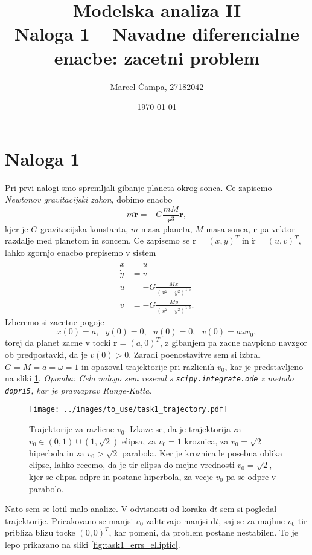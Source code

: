 \documentclass[11pt, a4paper]{article}
\title{Modelska analiza II\\\footnotesize Naloga 1 -- Navadne diferencialne enacbe: zacetni problem}
\author{Marcel Čampa, 27182042}
\date{\today}
\begin{document}
    \maketitle

    \section*{Naloga 1}
    Pri prvi nalogi smo spremljali gibanje planeta okrog sonca. Ce zapisemo \textit{Newtonov
    gravitacijski zakon}, dobimo enacbo
    $$ m \ddot{\mathbf{r}} = -G \frac{mM}{r^3} \mathbf{r},$$
    kjer je $G$ gravitacijska konstanta, $m$ masa planeta, $M$ masa sonca, $\mathbf{r}$ pa vektor razdalje med planetom in soncem.
    Ce zapisemo se $\mathbf{r} = (x, y)^T$ in $\dot{\mathbf{r}} = (u, v)^T$, lahko zgornjo enacbo prepisemo v
    sistem
    \begin{align*}
        \dot{x} &= u\\
        \dot{y} &= v\\
        \dot{u} &= -G \frac{Mx}{(x^2 + y^2)^{1.5}}\\
        \dot{v} &= -G \frac{My}{(x^2 + y^2)^{1.5}}.
    \end{align*}
    Izberemo si zacetne pogoje $$x(0) = a,~~~ y(0) = 0, ~~~u(0) = 0,~~~v(0) = a\omega v_0,$$
    torej da planet zacne v tocki $\mathbf{r} = (a, 0)^T$, z gibanjem pa zacne navpicno navzgor ob predpostavki, da je
    $v(0) > 0$. Zaradi poenostavitve sem si izbral $G = M = a = \omega = 1$ in opazoval trajektorije
    pri razlicnih $v_0$, kar je predstavljeno na sliki \ref{fig:task1_trajectory}. \textit{Opomba: Celo nalogo sem reseval
    s \texttt{scipy.integrate.ode} z metodo \texttt{dopri5}, kar je pravzaprav Runge-Kutta.}

    \begin{figure}[H]
        \centering
        \texttt{[image: ../images/to\_use/task1\_trajectory.pdf]}
        \caption{Trajektorije za razlicne $v_0$. Izkaze se, da je trajektorija za $v_0 \in (0, 1) \cup (1, \sqrt{2})$ elipsa,
        za $v_0 = 1$ kroznica, za $v_0 = \sqrt{2}$ hiperbola in za $v_0 > \sqrt{2}$ parabola. Ker je kroznica le posebna oblika elipse, lahko recemo, da je tir
        elipsa do mejne vrednosti $v_0 = \sqrt{2}$, kjer se elipsa odpre in postane hiperbola, za vecje $v_0$ pa se odpre v parabolo.}
        \label{fig:task1_trajectory}
    \end{figure}

    Nato sem se lotil malo analize. V odvisnosti od koraka $\text{d}t$ sem si pogledal trajektorije. Pricakovano se
    manjsi $v_0$ zahtevajo manjsi $\text{d}t$, saj se za majhne $v_0$ tir pribliza blizu tocke $(0,0)^T$, kar pomeni, da problem postane nestabilen.
    To je lepo prikazano na sliki \ref{fig:task1_errs_elliptic}.
\end{document}
